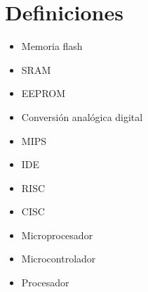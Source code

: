 
\section{Definiciones}

\begin{itemize}
\item Memoria flash
\item SRAM
\item EEPROM
\item Conversión analógica digital
\item MIPS
\item IDE
\item RISC
\item CISC
\item Microprocesador
\item Microcontrolador
\item Procesador
\end{itemize}
